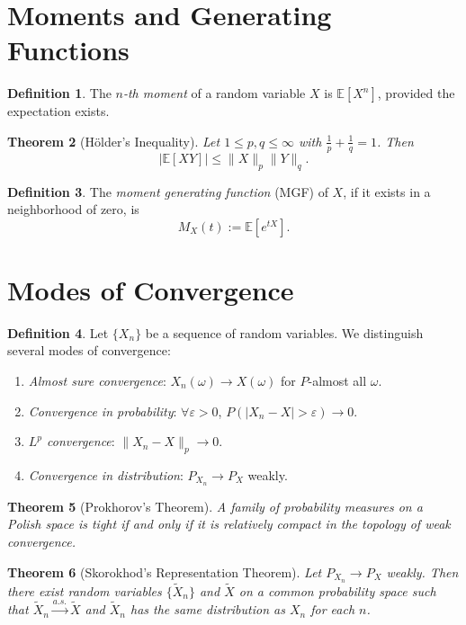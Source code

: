 \documentclass[11pt,reqno]{amsart}
\newtheorem{theorem}{Theorem}[section]
\theoremstyle{definition}
\newtheorem{definition}[theorem]{Definition}
\theoremstyle{remark}
\begin{document}
\section{Moments and Generating Functions}

\begin{definition}
	The \emph{$n$-th moment} of a random variable $X$ is $\mathbb{E}[X^n]$, provided the expectation exists.
\end{definition}

\begin{theorem}[Hölder's Inequality]
	Let $1 \leq p, q \leq \infty$ with $\frac{1}{p} + \frac{1}{q} = 1$. Then
	\[
		|\mathbb{E}[XY]| \leq \|X\|_p \|Y\|_q.
	\]
\end{theorem}

\begin{definition}
	The \emph{moment generating function} (MGF) of $X$, if it exists in a neighborhood of zero, is
	\[
		M_X(t) := \mathbb{E}[e^{tX}].
	\]
\end{definition}

\section{Modes of Convergence}

\begin{definition}
	Let $\{X_n\}$ be a sequence of random variables. We distinguish several modes of convergence:
	\begin{enumerate}[label=(\roman*)]
		\item \emph{Almost sure convergence}: $X_n(\omega) \to X(\omega)$ for $P$-almost all $\omega$.
		\item \emph{Convergence in probability}: $\forall \varepsilon>0$, $P(|X_n - X| > \varepsilon) \to 0$.
		\item \emph{$L^p$ convergence}: $\|X_n - X\|_p \to 0$.
		\item \emph{Convergence in distribution}: $P_{X_n} \to P_X$ weakly.
	\end{enumerate}
\end{definition}

\begin{theorem}[Prokhorov's Theorem]
	A family of probability measures on a Polish space is tight if and only if it is relatively compact in the topology of weak convergence.
\end{theorem}

\begin{theorem}[Skorokhod's Representation Theorem]
	Let $P_{X_n} \to P_X$ weakly. Then there exist random variables $\{\tilde{X}_n\}$ and $\tilde{X}$ on a common probability space such that $\tilde{X}_n \xrightarrow{a.s.} \tilde{X}$ and $\tilde{X}_n$ has the same distribution as $X_n$ for each $n$.
\end{theorem}
\end{document}
